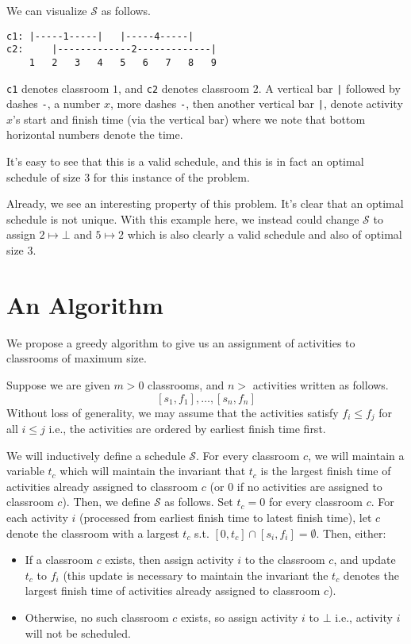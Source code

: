 \documentclass{article}
\theoremstyle{plain}%
\theoremstyle{definition}
\theoremstyle{remark}
\begin{document}
We can visualize $\mathcal{S}$ as follows.
\begin{verbatim}
c1: |-----1-----|   |-----4-----|
c2:     |-------------2-------------|
    1   2   3   4   5   6   7   8   9
\end{verbatim}
\lstinline{c1} denotes classroom $1$, and \lstinline{c2} denotes classroom $2$.
A vertical bar \lstinline{|} followed by dashes \lstinline{-}, a number $x$, more dashes
    \lstinline{-}, then another vertical bar \lstinline{|}, denote activity $x$'s start and
    finish time (via the vertical bar) where we note that bottom horizontal
    numbers denote the time.

It's easy to see that this is a valid schedule,
    and this is in fact an optimal schedule of size $3$ for this instance of
    the problem.

Already, we see an interesting property of this problem.
It's clear that an optimal schedule is not
unique.
With this example here, we instead could change $\mathcal{S}$ to assign $2 \mapsto \bot$ and $5 \mapsto 2$
    which is also clearly a valid schedule and also of optimal size $3$.

\section{An Algorithm}
We propose a greedy algorithm to give us an assignment of
    activities to classrooms of maximum size. 

Suppose we are given $m > 0 $ classrooms, and $n > $ activities written as follows.
\[
    [s_1,f_1], \dots,[s_n,f_n]
\]
Without loss of generality, we may assume that the activities satisfy 
    $f_i \le f_j$ for all $i \le j$ i.e., the activities are ordered by
    earliest finish time first.


We will inductively define a schedule $\mathcal{S}$.
For every classroom $c$, we will maintain a variable $t_c$ which will 
    maintain the invariant that $t_c$ is the largest finish time of activities
    already assigned to classroom $c$ (or $0$ if no activities are assigned to classroom $c$).
Then, we define $\mathcal{S}$ as follows.
Set $t_c = 0$ for every classroom $c$.
For each activity $i$ (processed from earliest finish time to latest finish time), 
    let $c$ denote the classroom with a largest $t_c$ s.t.
        $[0,t_{c}] \cap [s_i,f_i] = \emptyset$.
Then, either:
\begin{itemize}
    \item If a classroom $c$ exists, then
            assign activity $i$ to the classroom $c$, and update $t_c$ to
            $f_i$ (this update is necessary to maintain the invariant the $t_c$
            denotes the largest finish time of activities already assigned to
            classroom $c$).
    \item Otherwise, no such classroom $c$ exists, so assign activity $i$ to
        $\bot$ i.e., activity $i$ will not be scheduled.
\end{itemize}
\end{document}
